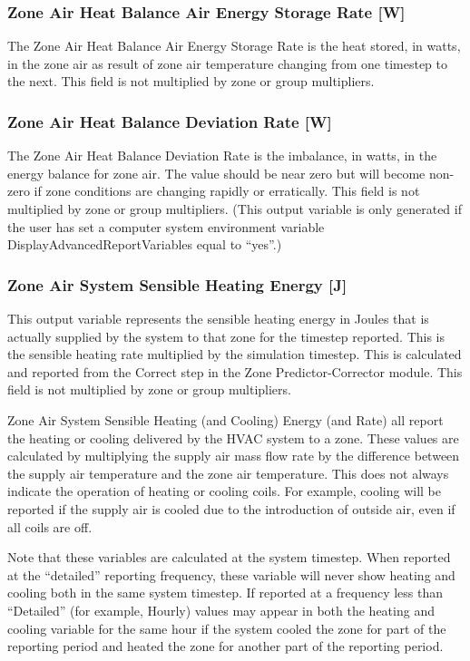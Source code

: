 \subsubsection{Zone Air Heat Balance Air Energy Storage Rate {[}W{]}}\label{zone-air-heat-balance-air-energy-storage-rate-w}

The Zone Air Heat Balance Air Energy Storage Rate is the heat stored, in watts, in the zone air as result of zone air temperature changing from one timestep to the next. This field is not multiplied by zone or group multipliers.

\subsubsection{Zone Air Heat Balance Deviation Rate {[}W{]}}\label{zone-air-heat-balance-deviation-rate-w}

The Zone Air Heat Balance Deviation Rate is the imbalance, in watts, in the energy balance for zone air. The value should be near zero but will become non-zero if zone conditions are changing rapidly or erratically. This field is not multiplied by zone or group multipliers. (This output variable is only generated if the user has set a computer system environment variable DisplayAdvancedReportVariables equal to ``yes''.)

\subsubsection{Zone Air System Sensible Heating Energy {[}J{]}}\label{zone-air-system-sensible-heating-energy-j}

This output variable represents the sensible heating energy in Joules that is actually supplied by the system to that zone for the timestep reported. This is the sensible heating rate multiplied by the simulation timestep. This is calculated and reported from the Correct step in the Zone Predictor-Corrector module. This field is not multiplied by zone or group multipliers.

\begin{callout}
Zone Air System Sensible Heating (and Cooling) Energy (and Rate) all report the heating or cooling delivered by the HVAC system to a zone. These values are calculated by multiplying the supply air mass flow rate by the difference between the supply air temperature and the zone air temperature. This does not always indicate the operation of heating or cooling coils. For example, cooling will be reported if the supply air is cooled due to the introduction of outside air, even if all coils are off.

Note that these variables are calculated at the system timestep. When reported at the ``detailed'' reporting frequency, these variable will never show heating and cooling both in the same system timestep. If reported at a frequency less than ``Detailed'' (for example, Hourly) values may appear in both the heating and cooling variable for the same hour if the system cooled the zone for part of the reporting period and heated the zone for another part of the reporting period.
\end{callout}

